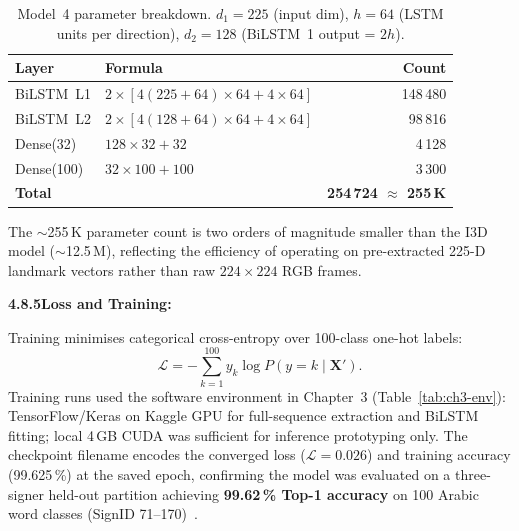 \begin{table}[H]
\centering
\caption{Model~4 parameter breakdown. $d_1{=}225$ (input dim), $h{=}64$ (LSTM units per direction), $d_2{=}128$ (BiLSTM~1 output = $2h$).}
\label{tab:ch4-params}
\small
\begin{tabular}{|P{3.5cm}|P{6.5cm}|r|}
\hline
\textbf{Layer} & \textbf{Formula} & \textbf{Count} \\
\hline
BiLSTM~L1 & $2 \times [4(225+64)\times64 + 4\times64]$ & 148\,480 \\
BiLSTM~L2 & $2 \times [4(128+64)\times64 + 4\times64]$ & 98\,816 \\
Dense(32) & $128\times32 + 32$ & 4\,128 \\
Dense(100) & $32\times100 + 100$ & 3\,300 \\
\hline
\textbf{Total} & & \textbf{254\,724 $\approx$ 255\,K} \\
\hline
\end{tabular}
\end{table}
\vspace{0.4cm}

\noindent The $\sim$255\,K parameter count is two orders of magnitude smaller than the I3D model ($\sim$12.5\,M), reflecting the efficiency of operating on pre-extracted 225-D landmark vectors rather than raw $224\!\times\!224$ RGB frames.\par\vspace{0.3cm}
\clearpage
\noindent\textbf{4.8.5\quad Loss and Training:}\par
{}
\vspace{0.3cm}

\noindent Training minimises categorical cross-entropy over 100-class one-hot labels:
\begin{equation}
\mathcal{L} = -\sum_{k=1}^{100} y_k \log P(y{=}k \mid \mathbf{X}').
\label{eq:ch4-bilstm-loss}
\end{equation}
Training runs used the software environment in Chapter~3 (Table~\ref{tab:ch3-env}): TensorFlow/Keras on Kaggle GPU for full-sequence extraction and BiLSTM fitting; local 4\,GB CUDA was sufficient for inference prototyping only. The checkpoint filename encodes the converged loss ($\mathcal{L} = 0.026$) and training accuracy (99.625\,\%) at the saved epoch, confirming the model was evaluated on a three-signer held-out partition achieving \textbf{99.62\,\% Top-1 accuracy} on 100 Arabic word classes (SignID 71--170)~\cite{sidig2021karsl}.\par\vspace{0.6cm}

